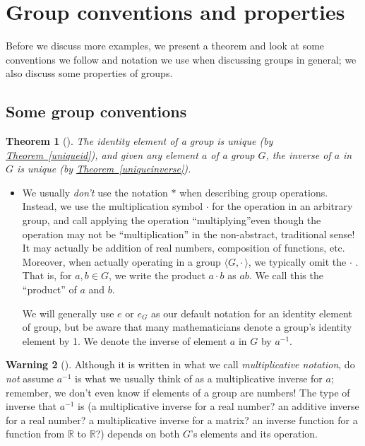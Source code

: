 \documentclass[10pt,]{book}
\theoremstyle{plain}
\newtheorem{theorem}{Theorem}[section]
\theoremstyle{definition}
\theoremstyle{definition}
\newtheorem{warning}[theorem]{Warning}
\theoremstyle{definition}
\theoremstyle{definition}
\numberwithin{equation}{section}
\def\R{\mathbb{R}}
\begin{document}
\section[{Group conventions and properties}]{Group conventions and properties}\label{section-7}
Before we discuss more examples, we present a theorem and look at some conventions we follow and notation we use when discussing groups in general; we also discuss some properties of groups.%
\typeout{************************************************}
\typeout{************************************************}
\subsection[{Some group conventions}]{Some group conventions}\label{subsection-1}
\begin{theorem}[{}]\label{theorem-9}
The identity element of a group is unique (by \hyperref[uniqueid]{Theorem~\ref{uniqueid}}), and given any element \(a\) of a group \(G\), the inverse of \(a\) in \(G\) is unique (by \hyperref[uniqueinverse]{Theorem~\ref{uniqueinverse}}).%
\end{theorem}
\leavevmode%
\begin{itemize}[label=\textbullet]
\item{}We usually \emph{don't} use the notation \(*\) when describing group operations. Instead, we use the multiplication symbol \(\cdot\) for the operation in an arbitrary group, and  call applying the operation ``multiplying''\textemdash{}even though the operation may not be ``multiplication'' in the non-abstract, traditional sense! It may actually be addition of real numbers, composition of functions, etc. Moreover, when actually operating in a group \(\langle G, \cdot\,\rangle\), we typically omit the \(\cdot\) . That is, for \(a,b\in G\), we write the product \(a\cdot b\) as \(ab\). We call this the ``product'' of \(a\) and \(b\).%
\par
We will generally use \(e\) or \(e_G\) as our default notation for an identity element of group, but be aware that many mathematicians denote a group's identity element by 1. We  denote the inverse of element \(a\) in \(G\) by \(a^{-1}\).%
\end{itemize}
\begin{warning}[]\label{warning-6}
Although it is written in what we call  \emph{multiplicative notation}, do \emph{not} assume \(a^{-1}\) is what we usually think of as a multiplicative inverse for \(a\); remember, we don't even know if elements of a group are numbers! The type of inverse that \(a^{-1}\) is (a multiplicative inverse for a real number? an additive inverse for a real number? a multiplicative inverse for a matrix? an inverse function for a function from \(\R\) to \(\R\)?) depends on both \(G\)'s elements and its operation.%
\end{warning}
\end{document}
